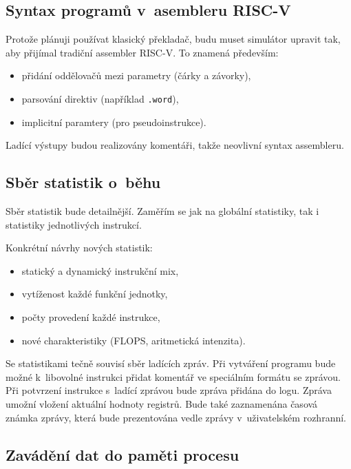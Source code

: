 \subsection{Syntax programů v~asembleru RISC-V}
\label{riscvSyntax}

Protože plánuji používat klasický překladač, budu muset simulátor upravit tak, aby přijímal tradiční assembler RISC-V.
To znamená především:
\begin{itemize}
    \item přidání oddělovačů mezi parametry (čárky a závorky),
    \item parsování direktiv (například \texttt{.word}),
    \item implicitní paramtery (pro pseudoinstrukce).
\end{itemize}

Ladící výstupy budou realizovány komentáři, takže neovlivní syntax assembleru.

\subsection{Sběr statistik o~běhu}
\label{statsCollection}

Sběr statistik bude detailnější.
Zaměřím se jak na globální statistiky, tak i statistiky jednotlivých instrukcí.

Konkrétní návrhy nových statistik:
\begin{itemize}
    \item statický a dynamický instrukční mix,
    \item vytíženost každé funkční jednotky,
    \item počty provedení každé instrukce,
    \item nové charakteristiky (FLOPS, aritmetická intenzita).
\end{itemize}

Se statistikami tečně souvisí sběr ladících zpráv.
Při vytváření programu bude možné k~libovolné instrukci přidat komentář ve speciálním formátu se zprávou.
Při potvrzení instrukce s~ladící zprávou bude zpráva přidána do logu.
Zpráva umožní vložení aktuální hodnoty registrů.
Bude také zaznamenána časová známka zprávy, která bude prezentována vedle zprávy v~uživatelském rozhranní.

\subsection{Zavádění dat do paměti procesu}
\label{memloader}

